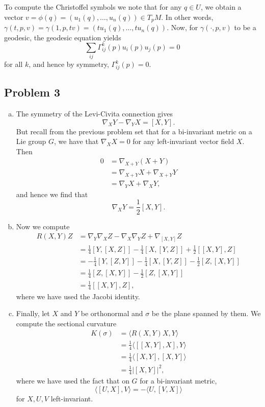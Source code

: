 \documentclass{../mathnotes}
\begin{document}
To compute the Christoffel symbols we note that for any $q\in U$, we 
obtain a vector $v=\phi(q)=(u_1(q),\ldots,u_n(q))\in T_pM$. In other words,
$\gamma(t,p,v)=\gamma(1,p,tv)=(tu_1(q),\ldots,tu_n(q))$. Now, for
$\gamma(\cdot, p, v)$ to be a geodesic, the geodesic equation yields
\[\sum_{ij}\Gamma_{ij}^k(p)u_i(p)u_j(p)=0\]
for all $k$, and hence by symmetry, $\Gamma_{ij}^k(p)=0$.

\subsection*{Problem 3}
\begin{enumerate}[(a)]
    \item The symmetry of the Levi-Civita connection gives
        \[\nabla_XY-\nabla_YX=[X,Y].\]
        But recall from the previous problem set that for a bi-invariant
        metric on a Lie group $G$, we have that $\nabla_XX=0$ for any
        left-invariant vector field $X$. Then
        \begin{align*}
            0&=\nabla_{X+Y}(X+Y)\\
            &= \nabla_{X+Y}X+\nabla_{X+Y}Y\\
            &= \nabla_YX+\nabla_XY,
        \end{align*}
        and hence we find that
        \[\nabla_XY=\frac{1}{2}[X,Y].\]
    \item Now we compute
        \begin{align*}
            R(X,Y)Z &= \nabla_Y\nabla_XZ-\nabla_X\nabla_YZ+\nabla_{[X,Y]}Z\\
            &= \frac{1}{4}\left[ Y, [X,Z] \right] - \frac{1}{4}\left[ X, [Y,Z] \right]+ \frac{1}{2}\left[ [X,Y],Z \right]\\
            &= -\frac{1}{4}\left[ Y, [Z,Y] \right] - \frac{1}{4}\left[ X, [Y,Z] \right]- \frac{1}{2}\left[ Z,[X,Y] \right]\\
            &= \frac{1}{4}\left[ Z,[X,Y] \right] - \frac{1}{2}\left[ Z,[X,Y] \right]\\
            &= \frac{1}{4}\left[ [X,Y],Z \right],
        \end{align*}
        where we have used the Jacobi identity.
    \item Finally, let $X$ and $Y$ be orthonormal and $\sigma$ be the plane spanned by them.
        We compute the sectional curvature
        \begin{align*}
            K(\sigma) &= \langle R(X,Y)X,Y\rangle\\
            &= \frac{1}{4}\langle \left[ [X,Y],X \right],Y\rangle\\
            &=\frac{1}{4}\langle [X,Y],[X,Y]\rangle\\
            &= \frac{1}{4}|[X,Y]|^2,
        \end{align*}
        where we have used the fact that on $G$ for a bi-invariant metric,
        \[\langle [U,X],V\rangle = -\langle U,[V,X]\rangle\]
        for $X,U,V$ left-invariant.
\end{enumerate}
\end{document}
